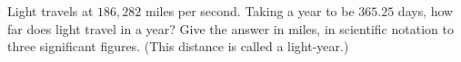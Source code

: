Light travels at $186{,}282$ miles per second. Taking a year to be $365.25$ days, how far does light travel in a year? Give the answer in miles, in scientific notation to three significant figures. (This distance is called a light-year.)
